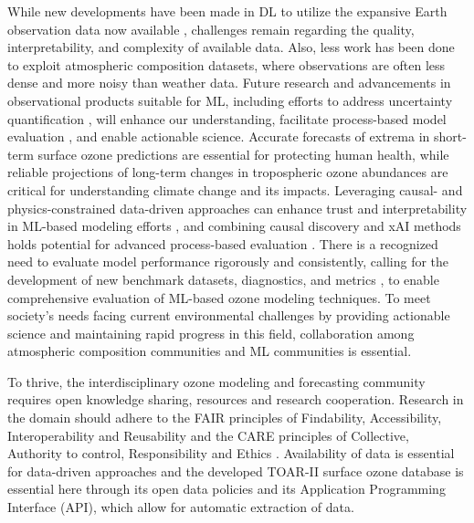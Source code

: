\documentclass[gmd, manuscript]{copernicus}
\begin{document}
While new developments have been made in DL to utilize the expansive Earth observation data now available \citep{Eyring2024}, challenges remain regarding the quality, interpretability, and complexity of available data. Also, less work has been done to exploit atmospheric composition datasets, where observations are often less dense and more noisy than weather data. Future research and advancements in observational products suitable for ML, including efforts to address uncertainty quantification \citep[e.g.,][]{Haynes2023}, will enhance our understanding, facilitate process-based model evaluation \citep{Nowack2020}, and enable actionable science. Accurate forecasts of extrema in short-term surface ozone predictions are essential for protecting human health, while reliable projections of long-term changes in tropospheric ozone abundances are critical for understanding climate change and its impacts. Leveraging causal- and physics-constrained data-driven approaches can enhance trust and interpretability in ML-based modeling efforts \citep{Tesch2023,Beucler2024}, and combining causal discovery and xAI methods holds potential for advanced process-based evaluation \citep{IglesiasSuarez2024}. There is a recognized need to evaluate model performance rigorously and consistently, calling for the development of new benchmark datasets, diagnostics, and metrics \citep{Betancourt2021, betancourt_global_2022}, to enable comprehensive evaluation of ML-based ozone modeling techniques. 
To meet society's needs facing current environmental challenges by providing actionable science and maintaining rapid progress in this field, collaboration among atmospheric composition communities and ML communities is essential.

To thrive, the interdisciplinary ozone modeling and forecasting community requires open knowledge sharing, resources and research cooperation. Research in the domain should adhere to the FAIR principles of Findability, Accessibility, Interoperability and Reusability \citep{Wilkinson2008} and the CARE principles of Collective, Authority to control, Responsibility and Ethics \citep{Carroll2021}. Availability of data is essential for data-driven approaches and the developed TOAR-II surface ozone database is essential here through its open data policies and its Application Programming Interface (API), which allow for automatic extraction of data. %
\end{document}
